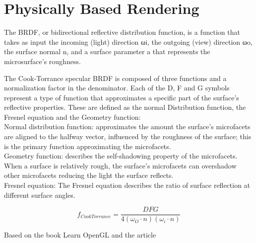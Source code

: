 \newpage
\section{Physically Based Rendering}
The BRDF, or bidirectional reflective distribution function, is a function that takes as input the incoming (light) direction ωi, the outgoing (view) direction ωo, the surface normal n, and a surface parameter a that represents the microsurface's roughness.

The Cook-Torrance specular BRDF is composed of three functions and a normalization factor in the denominator. Each of the D, F and G symbols represent a type of function that approximates a specific part of the surface's reflective properties. These are defined as the normal Distribution function, the Fresnel equation and the Geometry function:\\
Normal distribution function: approximates the amount the surface's microfacets are aligned to the halfway vector, influenced by the roughness of the surface; this is the primary function approximating the microfacets.\\
Geometry function: describes the self-shadowing property of the microfacets. When a surface is relatively rough, the surface's microfacets can overshadow other microfacets reducing the light the surface reflects.\\
Fresnel equation: The Fresnel equation describes the ratio of surface reflection at different surface angles.

\[
f_{CookTorrance}=\frac{DFG}{4(\omega_{O} \cdot n)(\omega_{i} \cdot n)}
\]

Based on the book Learn OpenGL \cite{learnopengl} and the article \cite{pbrreferences}